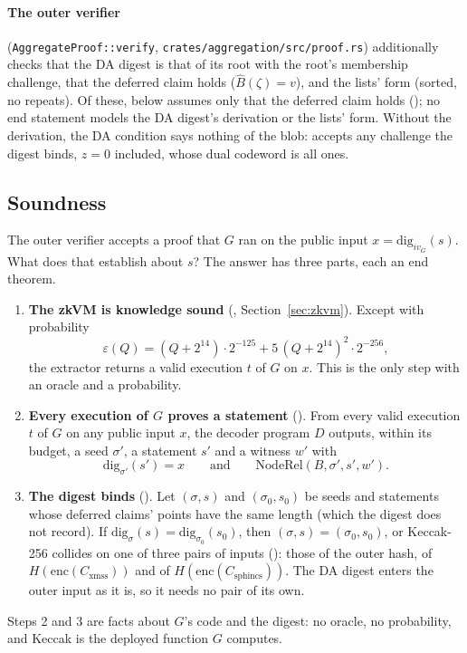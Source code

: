\documentclass[11pt]{article}
\newcommand{\Cx}{C_{\mathrm{xmss}}}
\newcommand{\Cs}{C_{\mathrm{sphincs}}}
\newcommand{\enc}{\mathrm{enc}}
\begin{document}
\paragraph{The outer verifier} (\texttt{AggregateProof::verify},
\texttt{crates/aggregation/src/proof.rs}) additionally checks that the DA digest is that of its root
with the root's membership challenge, that the deferred claim holds ($\widehat{B}(\zeta) = v$), and
the lists' form (sorted, no repeats). Of these,  below
assumes only that the deferred claim holds (); no end statement
models the DA digest's derivation or the lists' form. Without the derivation, the DA condition says
nothing of the blob:  accepts any challenge the digest binds, $z = 0$
included, whose dual codeword is all ones.

\subsection{Soundness}

The outer verifier accepts a proof that $G$ ran on the public input $x = \mathrm{dig}_{iv_G}(s)$.
What does that establish about $s$? The answer has three parts, each an end theorem.
\begin{enumerate}
\item \textbf{The zkVM is knowledge sound} (,
Section~\ref{sec:zkvm}). Except with probability
\[
\varepsilon(Q) = (Q+2^{14})\cdot 2^{-125} + 5\,(Q+2^{14})^2\cdot 2^{-256},
\]
the extractor returns a valid execution $t$ of $G$ on $x$. This is the only step with an oracle
and a probability.
\item \textbf{Every execution of $G$ proves a statement} (). From
every valid execution $t$ of $G$ on any public input $x$, the decoder program $D$ outputs, within
its budget, a seed $\sigma'$, a statement $s'$ and a witness $w'$ with
\[
\mathrm{dig}_{\sigma'}(s') = x \qquad\text{and}\qquad \mathrm{NodeRel}(B, \sigma', s', w').
\]
\item \textbf{The digest binds} (). Let $(\sigma, s)$ and $(\sigma_0, s_0)$
be seeds and statements whose deferred claims' points have the same length (which the digest does not record). If
$\mathrm{dig}_\sigma(s) = \mathrm{dig}_{\sigma_0}(s_0)$, then $(\sigma, s) = (\sigma_0, s_0)$, or
Keccak-256 collides on one of three pairs of inputs (): those of the
outer hash, of $H(\enc(\Cx))$ and of $H(\enc(\Cs))$. The DA digest enters the outer input as it
is, so it needs no pair of its own.
\end{enumerate}
Steps 2 and 3 are facts about $G$'s code and the digest: no oracle, no probability, and Keccak is
the deployed function $G$ computes.
\end{document}
